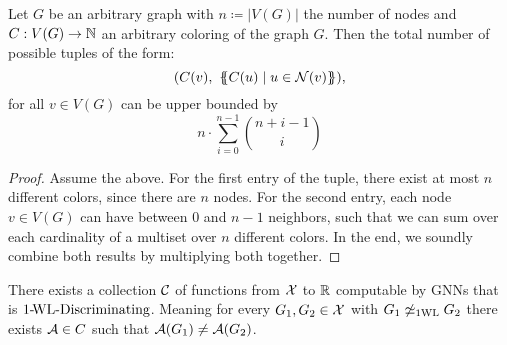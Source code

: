 \begin{lemma}\label{lem:1wl_color_upper_bound}
    Let $G$ be an arbitrary graph with $n \coloneqq |V(G)|$ the number of nodes and $C: V(G) \rightarrow \mathbb{N}$ an arbitrary coloring of the graph $G$. Then the total number of possible tuples of the form:
    \begin{equation*}
        (C(v), \ \{\!\!\{ C(u) \mid u \in \mathcal{N}(v) \}\!\!\}),
    \end{equation*}
    for all $v \in V(G)$ can be upper bounded by
    \begin{equation*}
        n \cdot \sum_{i=0}^{n-1} \binom{n+i -1}{i}
    \end{equation*}
\end{lemma}
\begin{proof}
    Assume the above. For the first entry of the tuple, there exist at most $n$ different colors, since there are $n$ nodes. For the second entry, each node $v \in V(G)$ can have between $0$ and $n-1$ neighbors, such that we can sum over each cardinality of a multiset over $n$ different colors. In the end, we soundly combine both results by multiplying both together.
\end{proof}


\begin{lemma}\label{lem:gnn_1wl_disc}
    There exists a collection $\mathcal{C}$ of functions from $\mathcal{X}$ to $\mathbb{R}$ computable by GNNs that is $\text{1-\!WL-Discriminating}$. Meaning for every $G_1, G_2 \in \mathcal{X}$ with $G_1 \not\simeq_{\text{1WL}} G_2$ there exists $\mathcal{A} \in C$ such that $\mathcal{A}(G_1) \neq \mathcal{A}(G_2)$.
\end{lemma}

